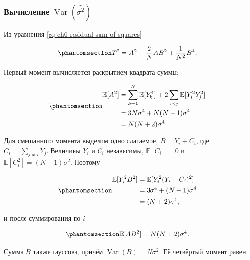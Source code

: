 \documentclass[
  russian,
  11pt,
  a4paper,
  open=any]{scrbook}
\begin{document}
\begin{bookderivation}

\subsubsection{\texorpdfstring{Вычисление
\(\operatorname{Var}(\widehat{\sigma^2})\)}{Вычисление \textbackslash operatorname\{Var\}(\textbackslash widehat\{\textbackslash sigma\^{}2\})}}\label{ux432ux44bux447ux438ux441ux43bux435ux43dux438ux435-operatornamevarwidehatsigma2}

Из уравнения \ref{eq-ch6-residual-sum-of-squares}

\begin{equation}\protect\phantomsection\label{eq-ch6-residual-sum-square-expanded}{
T^2=A^2-\frac2N AB^2+\frac1{N^2}B^4.
}\end{equation}

Первый момент вычисляется раскрытием квадрата суммы:

\begin{equation}\protect\phantomsection\label{eq-ch6-a-second-moment}{
\begin{aligned}
\mathbb E[A^2]
&=\sum_{k=1}^{N}\mathbb E[Y_k^4]
+2\sum_{i<j}\mathbb E[Y_i^2Y_j^2]\\
&=3N\sigma^4+N(N-1)\sigma^4\\
&=N(N+2)\sigma^4.
\end{aligned}
}\end{equation}

Для смешанного момента выделим одно слагаемое, \(B=Y_i+C_i\), где
\(C_i=\sum_{j\ne i}Y_j\). Величины \(Y_i\) и \(C_i\) независимы,
\(\mathbb E[C_i]=0\) и \(\mathbb E[C_i^2]=(N-1)\sigma^2\). Поэтому

\begin{equation}\protect\phantomsection\label{eq-ch6-one-term-ab2-moment}{
\begin{aligned}
\mathbb E[Y_i^2B^2]
&=\mathbb E[Y_i^2(Y_i+C_i)^2]\\
&=3\sigma^4+(N-1)\sigma^4\\
&=(N+2)\sigma^4,
\end{aligned}
}\end{equation}

и после суммирования по \(i\)

\begin{equation}\protect\phantomsection\label{eq-ch6-ab2-moment}{
\mathbb E[AB^2]=N(N+2)\sigma^4.
}\end{equation}

Сумма \(B\) также гауссова, причём \(\operatorname{Var}(B)=N\sigma^2\).
Её четвёртый момент равен


\end{bookderivation}
\end{document}
